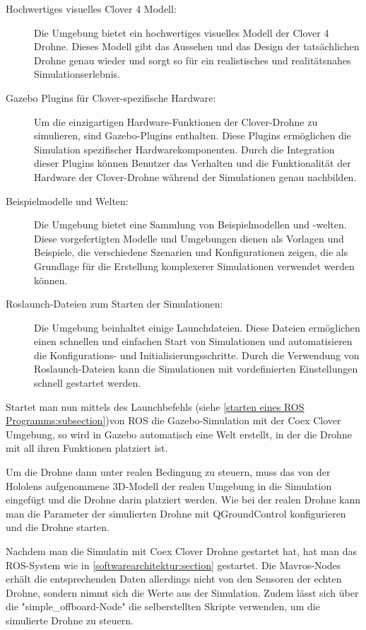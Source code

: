 \begin{description}
    \item[Hochwertiges visuelles Clover 4 Modell:] Die Umgebung bietet ein hochwertiges visuelles Modell der Clover 4 Drohne. Dieses Modell gibt das Aussehen und das Design der tatsächlichen Drohne genau wieder und sorgt so für ein realistisches und realitätsnahes Simulationserlebnis. 
    
    \item[Gazebo Plugins für Clover-spezifische Hardware:] Um die einzigartigen Hardware-Funktionen der Clover-Drohne zu simulieren, sind Gazebo-Plugins enthalten. Diese Plugins ermöglichen die Simulation spezifischer Hardwarekomponenten. Durch die Integration dieser Plugins können Benutzer das Verhalten und die Funktionalität der Hardware der Clover-Drohne während der Simulationen genau nachbilden.
    
    \item[Beispielmodelle und Welten:] Die Umgebung bietet eine Sammlung von Beispielmodellen und -welten. Diese vorgefertigten Modelle und Umgebungen dienen als Vorlagen und Beispiele, die verschiedene Szenarien und Konfigurationen zeigen, die als Grundlage für die Erstellung komplexerer Simulationen verwendet werden können.
    
    \item[Roslaunch-Dateien zum Starten der Simulationen:] Die Umgebung beinhaltet einige Launchdateien. Diese Dateien ermöglichen einen schnellen und einfachen Start von Simulationen und automatisieren die Konfigurations- und Initialisierungsschritte. Durch die Verwendung von Roslaunch-Dateien kann die Simulationen mit vordefinierten Einstellungen schnell gestartet werden.   
\end{description}

Startet man nun mittels des Launchbefehls (siehe \ref{starten eines ROS Programms:subsection})von \ac{ROS} die Gazebo-Simulation mit der Coex Clover Umgebung, so wird in Gazebo automatisch eine Welt erstellt, in der die Drohne mit all ihren Funktionen platziert ist.

Um die Drohne dann unter realen Bedingung zu steuern, muss das von der Hololens aufgenommene 3D-Modell der realen Umgebung in die Simulation eingefügt und die Drohne darin platziert werden. Wie bei der realen Drohne kann man die Parameter der simulierten Drohne mit QGroundControl konfigurieren und die Drohne starten.

Nachdem man die Simulatin mit Coex Clover Drohne gestartet hat, hat man das \ac{ROS}-System wie in \ref{softwarearchitektur:section} gestartet.
Die Mavros-Nodes erhält die entsprechenden Daten allerdings nicht von den Sensoren der echten Drohne, sondern nimmt sich die Werte aus der Simulation. Zudem lässt sich über die "simple\_offboard-Node" die selberstellten Skripte verwenden, um die simulierte Drohne zu steuern.

